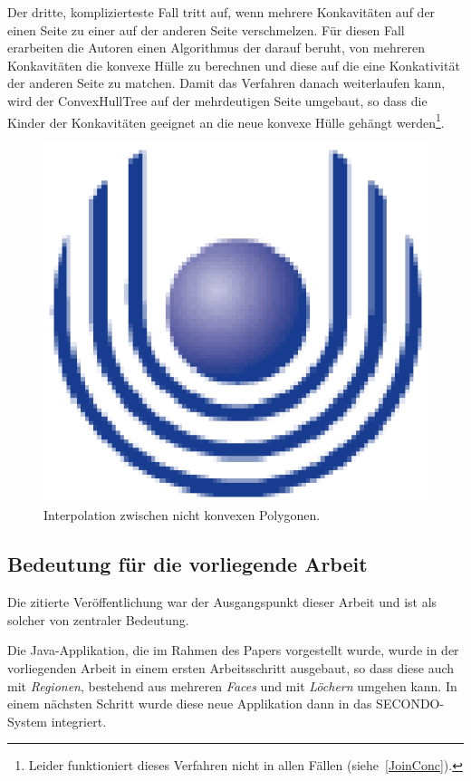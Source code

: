 Der dritte, komplizierteste Fall tritt auf, wenn mehrere Konkavitäten auf der einen Seite zu einer auf der anderen Seite verschmelzen. Für diesen Fall erarbeiten die Autoren einen Algorithmus der darauf beruht, von mehreren Konkavitäten die konvexe Hülle zu berechnen und diese auf die eine Konkativität der anderen Seite zu matchen. Damit das Verfahren danach weiterlaufen kann, wird der ConvexHullTree auf der mehrdeutigen Seite umgebaut, so dass die Kinder der Konkavitäten geeignet an die neue konvexe Hülle gehängt werden\footnote{Leider funktioniert dieses Verfahren nicht in allen Fällen (siehe~\vref{JoinConc}).}.

\begin{figure}
	\centering
	\includegraphics{feu_logo2.eps}
	\caption{Interpolation zwischen nicht konvexen Polygonen.}
	\label{fig:Interpolationnonconvex}
\end{figure}

\subsection{Bedeutung für die vorliegende Arbeit}

Die zitierte Veröffentlichung war der Ausgangspunkt dieser Arbeit und ist als solcher von zentraler Bedeutung.

Die Java-Applikation, die im Rahmen des Papers vorgestellt wurde, wurde in der vorliegenden Arbeit in einem ersten Arbeitsschritt ausgebaut, so dass diese auch mit \textit{Regionen}, bestehend aus mehreren \textit{Faces} und mit \textit{Löchern} umgehen kann. In einem nächsten Schritt wurde diese neue Applikation dann in das SECONDO-System integriert.

